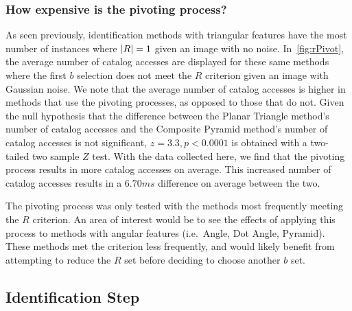 \subsubsection{How expensive is the pivoting process?}
As seen previously, identification methods with triangular features have the most number of instances where
$\left| R \right| = 1$ given an image with no noise.
In~\autoref{fig:rPivot}, the average number of catalog accesses are displayed for these same methods where the first
$b$ selection does not meet the $R$ criterion given an image with Gaussian noise.
We note that the average number of catalog accesses is higher in methods that use the pivoting processes,
as opposed to those that do not.
Given the null hypothesis that the difference between the Planar Triangle method's number of catalog accesses and
the Composite Pyramid method's number of catalog accesses is not significant, $z = 3.3, p < 0.0001$ is
obtained with a two-tailed two sample $Z$ test.
With the data collected here, we find that the pivoting process results in more catalog accesses on average.
This increased number of catalog accesses results in a $6.70\si{ms}$ difference on average between the two.

The pivoting process was only tested with the methods most frequently meeting the $R$ criterion.
An area of interest would be to see the effects of applying this process to methods with angular features (i.e.\ Angle,
Dot Angle, Pyramid).
These methods met the criterion less frequently, and would likely benefit from attempting to reduce the $R$ set before
deciding to choose another $b$ set.

\subsection{Identification Step}\label{subsec:identificationStep}
\begin{figure}
\end{figure}

